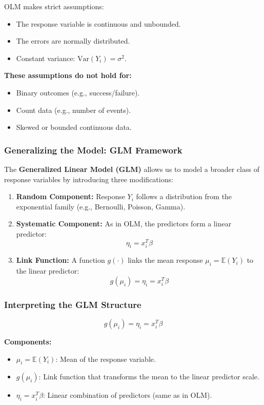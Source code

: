 \documentclass[12pt,a4paper]{article}
\begin{document}
OLM makes strict assumptions:
\begin{itemize}
  \item The response variable is continuous and unbounded.
  \item The errors are normally distributed.
  \item Constant variance: \( \text{Var}(Y_i) = \sigma^2 \).
\end{itemize}

\textbf{These assumptions do not hold for:}
\begin{itemize}
  \item Binary outcomes (e.g., success/failure).
  \item Count data (e.g., number of events).
  \item Skewed or bounded continuous data.
\end{itemize}

\subsubsection*{Generalizing the Model: GLM Framework}

The \textbf{Generalized Linear Model (GLM)} allows us to model a broader class of response variables by introducing three modifications:

\begin{enumerate}
  \item \textbf{Random Component:} Response \( Y_i \) follows a distribution from the exponential family (e.g., Bernoulli, Poisson, Gamma).
  
  \item \textbf{Systematic Component:} As in OLM, the predictors form a linear predictor:
  \[
  \eta_i = x_i^T \beta
  \]

  \item \textbf{Link Function:} A function \( g(\cdot) \) links the mean response \( \mu_i = \mathbb{E}(Y_i) \) to the linear predictor:
  \[
  g(\mu_i) = \eta_i = x_i^T \beta
  \]
\end{enumerate}

\subsubsection*{Interpreting the GLM Structure}

\[
g(\mu_i) = \eta_i = x_i^T \beta
\]

\textbf{Components:}
\begin{itemize}
  \item \( \mu_i = \mathbb{E}(Y_i) \): Mean of the response variable.
  \item \( g(\mu_i) \): Link function that transforms the mean to the linear predictor scale.
  \item \( \eta_i = x_i^T \beta \): Linear combination of predictors (same as in OLM).
\end{itemize}
\end{document}
